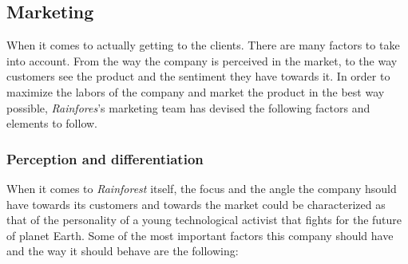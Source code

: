 \documentclass[english,runningheads,a4paper]{llncs}[2018/03/10]
\begin{document}

    \subsection*{Marketing}

    When it comes to actually getting to the clients. There are many factors to
    take into account. From the way the company is perceived in the market, to
    the way customers see the product and the sentiment they have towards it. In
    order to maximize the labors of the company and market the product in the
    best way possible, \textit{Rainfores}'s marketing team has devised the
    following factors and elements to follow.


        \subsubsection*{Perception and differentiation}

        When it comes to \textit{Rainforest} itself, the focus and the angle the
        company hsould have towards its customers and towards the market could
        be characterized as that of the personality of a young technological
        activist that fights for the future of planet Earth. Some of the most
        important factors this company should have and the way it should behave
        are the following:
\end{document}

